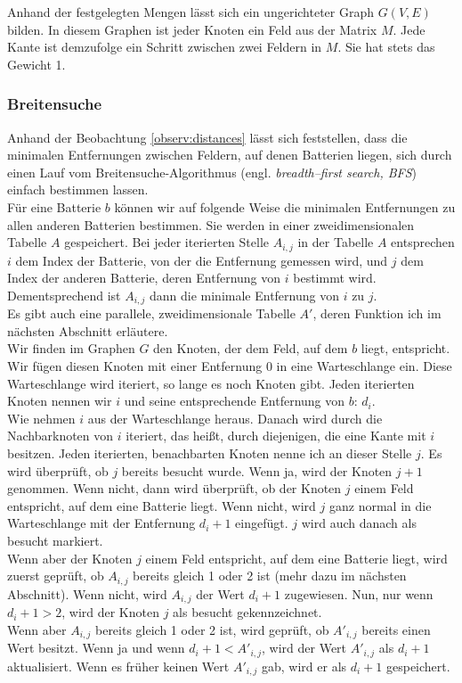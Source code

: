 \documentclass[a4paper,10pt,ngerman]{scrartcl}
\begin{document}
Anhand der festgelegten Mengen lässt sich ein ungerichteter Graph $G(V, E)$ bilden.
In diesem Graphen ist jeder Knoten ein Feld aus der Matrix $M$. Jede Kante ist demzufolge ein
Schritt zwischen zwei Feldern in $M$. Sie hat stets das Gewicht 1.

\subsubsection{Breitensuche}
Anhand der Beobachtung \ref{observ:distances} lässt sich feststellen, dass die minimalen Entfernungen zwischen Feldern,
auf denen Batterien liegen, sich durch einen Lauf vom Breitensuche-Algorithmus 
(engl. \textit{breadth--first search, BFS}) einfach bestimmen lassen.\\

Für eine Batterie $b$ können wir auf folgende Weise die minimalen Entfernungen zu allen anderen Batterien bestimmen.
Sie werden in einer zweidimensionalen Tabelle $A$ gespeichert.
Bei jeder iterierten Stelle $A_{i,j}$ in der Tabelle $A$ entsprechen $i$ dem Index der Batterie,
von der die Entfernung gemessen wird, und $j$ dem Index der anderen Batterie, deren Entfernung von $i$ bestimmt wird.
Dementsprechend ist $A_{i,j}$ dann die minimale Entfernung von $i$ zu $j$.\\
Es gibt auch eine parallele, zweidimensionale Tabelle $A'$, deren Funktion ich im nächsten Abschnitt erläutere.\\
Wir finden im Graphen $G$ den Knoten, der dem Feld, auf dem $b$ liegt, entspricht.
Wir fügen diesen Knoten mit einer Entfernung 0 in eine Warteschlange ein.
Diese Warteschlange wird iteriert, so lange es noch Knoten gibt.
Jeden iterierten Knoten nennen wir $i$ und seine entsprechende Entfernung von $b$: $d_i$.\\
Wie nehmen $i$ aus der Warteschlange heraus. 
Danach wird durch die Nachbarknoten von $i$ iteriert, das heißt, durch diejenigen, die eine Kante mit $i$ besitzen.
Jeden iterierten, benachbarten Knoten nenne ich an dieser Stelle $j$.
Es wird überprüft, ob $j$ bereits besucht wurde. Wenn ja, wird der Knoten $j+1$ genommen.
Wenn nicht, dann wird überprüft, ob der Knoten $j$ einem Feld entspricht, auf dem eine Batterie liegt.
Wenn nicht, wird $j$ ganz normal in die Warteschlange mit der Entfernung $d_i + 1$ eingefügt.
$j$ wird auch danach als besucht markiert.\\
Wenn aber der Knoten $j$ einem Feld entspricht, auf dem eine Batterie liegt, wird zuerst geprüft,
ob $A_{i,j}$ bereits gleich 1 oder 2 ist (mehr dazu im nächsten Abschnitt).
Wenn nicht, wird $A_{i,j}$ der Wert $d_i + 1$ zugewiesen. Nun, nur wenn $d_i + 1 > 2$, wird der Knoten $j$ als
besucht gekennzeichnet.\\
Wenn aber $A_{i,j}$ bereits gleich 1 oder 2 ist, wird geprüft, ob $A'_{i,j}$ bereits einen Wert besitzt.
Wenn ja und wenn $d_i + 1 < A'_{i,j}$, wird der Wert $A'_{i,j}$ als $d_i + 1$ aktualisiert. 
Wenn es früher keinen Wert $A'_{i,j}$ gab, wird er als $d_i + 1$ gespeichert.\\
\end{document}
